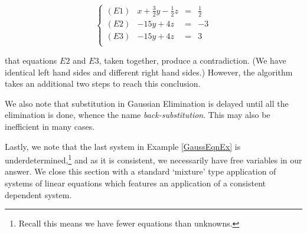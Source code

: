 \[ \left\{ \begin{array}{lrcr} (E1) & x+\frac{3}{2}y-\frac{1}{2}z & = & \frac{1}{2} \\ [3pt]
(E2) & -15y+4z & = & -3 \\ [3pt]
(E3) & -15y+4z & = & 3 \\ \end{array}  \right.\] 

that equations $E2$ and $E3$,  taken together,  produce a contradiction. (We have identical left hand sides and different right hand sides.)  However, the algorithm takes an additional two steps to reach this conclusion.  

We also note that substitution in Gaussian Elimination is delayed until all the elimination is done, whence the name   \textit{back-substitution}.  This may also be inefficient in many cases.

Lastly, we note that the last system in Example \ref{GaussEqnEx} is underdetermined,\footnote{Recall this means we have fewer equations than unknowns.}  and as it is consistent, we necessarily have free variables in our answer.  We close this section with a standard `mixture' type application of systems of linear equations which features an application of a consistent dependent system.

